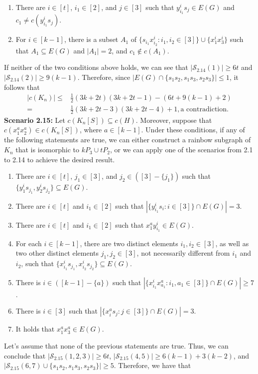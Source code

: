 \documentclass[12pt]{article}
\begin{document}
  \begin{enumerate}
 \item There are $i\in[t]$, $i_1\in[2]$, and $j\in[3]$ such that $y^i_{i_1}s_j\in E(G)$ and $c_1\neq c(y^i_{i_1}s_j)$.
 \item For $i\in[k-1]$, there is a subset $A_1$ of $\{s_{i_1}x^i_{i_2}:i_1,i_2\in[3]\}\cup \{x^i_1x^i_3\}$ such that $A_1\subseteq E(G)$ and $|A_1|=2$, and $c_1\not\in c(A_1)$.
 \end{enumerate}
 If neither of the two conditions above holds, we can see that \( |\mathcal{S}_{2.14}(1)| \geq 6t \) and \( |\mathcal{S}_{2.14}(2)| \geq 9(k - 1) \). Therefore, since \( |E(G)\cap\{s_1s_2,s_1s_3,s_2s_3\}|\leq 1 \), it follows that
  \begin{align*}
  |c(K_n)|\leq & \frac{1}{2}(3k+2t)(3k+2t-1)-(6t+9(k-1)+2)\\
  =&\frac{1}{2}(3k+2t-3)(3k+2t-4)+1, \text{a contradiction}.
\end{align*}
{\bf Scenario 2.15:} Let \( c(K_n[S]) \subseteq c(H) \). Moreover, suppose that \( c(x^a_1x^a_2) \in c(K_n[S]) \), where \( a \in [k-1] \). Under these conditions, if any of the following statements are true, we can either construct a rainbow subgraph of \( K_n \) that is isomorphic to \( kP_3 \cup tP_2 \), or we can apply one of the scenarios from 2.1 to 2.14 to achieve the desired result.
\begin{enumerate}
  \item There are $i\in[t]$, $j_1\in[3]$, and $j_2\in([3]-\{j_1\})$ such that $\{y^i_1s_{j_1},y^i_2s_{j_2}\}\subseteq E(G)$.
  \item There are $i\in[t]$ and $i_1\in[2]$ such that  $|\{y^i_{i_1}s_i:i\in[3]\}\cap E(G)|=3$.
   \item There are $i\in[t]$ and $i_1\in[2]$ such that $x^a_{1}y^i_{i_1}\in E(G)$.
  \item For each \( i \in [k-1] \), there are two distinct elements \( i_1, i_2 \in [3] \), as well as two other distinct elements \( j_1, j_2 \in [3] \), not necessarily different from $i_1$ and $i_2$,   such that \( \{ x^i_{i_1} s_{j_1}, x^i_{i_2} s_{j_2} \} \subseteq E(G) \).
    \item There is $i\in([k-1]-\{a\})$ such that $|\{x^i_{i_1}x^a_{a_1}:i_1,a_1\in[3]\}\cap E(G)|\geq7$.
  \item There is $i\in[3]$ such that $|\{x^a_{i}s_j:j\in[3]\}\cap E(G)|=3$.
  \item It holds that $x^a_1x^a_3\in E(G)$.
\end{enumerate}
Let’s assume that none of the previous statements are true. Thus, we can conclude that \( |\mathcal{S}_{2.15}(1,2,3)| \geq 6t \), \( |\mathcal{S}_{2.15}(4,5)| \geq 6(k - 1) + 3(k - 2) \), and \( |\mathcal{S}_{2.15}(6,7)\cup\{s_1s_2,s_1s_3,s_2s_3\}| \geq 5 \). Therefore, we have that
\end{document}
